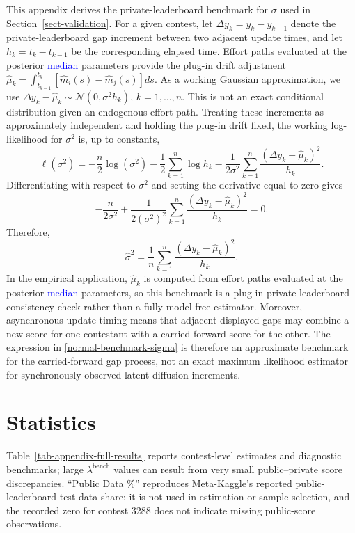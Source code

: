 \documentclass[mnsc]{informs3}
\begin{document}
\begin{APPENDICES}
This appendix derives the private-leaderboard benchmark for $\sigma$ used in Section~\ref{sect-validation}.
For a given contest, let $\Delta y_k=y_k-y_{k-1}$ denote the private-leaderboard gap increment between two adjacent update times, and let $h_k=t_k-t_{k-1}$ be the corresponding elapsed time.
Effort paths evaluated at the posterior \textcolor{blue}{median} parameters provide the plug-in drift adjustment $\hat\mu_k=\int_{t_{k-1}}^{t_k}\left[\hat m_i(s)-\hat m_j(s)\right]ds$.
As a working Gaussian approximation, we use $\Delta y_k-\hat\mu_k\sim\mathcal N(0,\sigma^2 h_k)$, $k=1,\ldots,n$.
This is not an exact conditional distribution given an endogenous effort path. Treating these increments as approximately independent and holding the plug-in drift fixed, the working log-likelihood for $\sigma^2$ is, up to constants,
\[
\ell(\sigma^2)
=
-\frac{n}{2}\log(\sigma^2)
-\frac{1}{2}\sum_{k=1}^n\log h_k
-\frac{1}{2\sigma^2}\sum_{k=1}^n
\frac{(\Delta y_k-\hat\mu_k)^2}{h_k}.
\]
Differentiating with respect to $\sigma^2$ and setting the derivative equal to zero gives
\[
-\frac{n}{2\sigma^2}
+
\frac{1}{2(\sigma^2)^2}
\sum_{k=1}^n
\frac{(\Delta y_k-\hat\mu_k)^2}{h_k}
=0.
\]
Therefore,
\begin{equation}\label{normal-benchmark-sigma}
\hat{\sigma}^2
=
\frac{1}{n}\sum_{k=1}^n
\frac{(\Delta y_k-\hat\mu_k)^2}{h_k}.
\end{equation}
In the empirical application, {$\hat\mu_k$ is computed from effort paths evaluated at the posterior \textcolor{blue}{median} parameters}, so this benchmark is a plug-in private-leaderboard consistency check rather than a fully model-free estimator. Moreover, asynchronous update timing means that adjacent displayed gaps may combine a new score for one contestant with a carried-forward score for the other. The expression in \eqref{normal-benchmark-sigma} is therefore an approximate benchmark for the carried-forward gap process, not an exact maximum likelihood estimator for synchronously observed latent diffusion increments.








\section{Statistics}\label{appendix-statistics}

Table~\ref{tab-appendix-full-results} reports {contest-level estimates and diagnostic benchmarks; large $\lambda^{\mathrm{bench}}$ values can result from very small public--private score discrepancies}.
{``Public Data \%'' reproduces Meta-Kaggle's reported public-leaderboard test-data share; it is not used in estimation or sample selection, and the recorded zero for contest 3288 does not indicate missing public-score observations.}


\end{APPENDICES}
\end{document}
